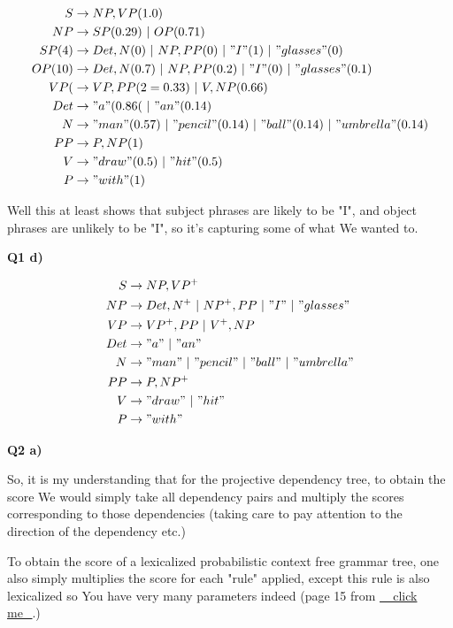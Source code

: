 \documentclass{article}
\newcommand*\OR{\ |\ }
\begin{document}
	\begin{align}
		S &\to NP, VP (1.0)\\
		NP &\to SP (0.29)\OR  OP (0.71)\\
		SP (4) &\to Det, N (0) \OR NP, PP (0)\OR "I" (1) \OR "glasses" (0)\\
		OP (10)&\to  Det, N (0.7) \OR NP, PP (0.2)\OR "I" (0)\OR "glasses" (0.1)\\
		VP (&\to VP, PP (2=0.33)\OR V, NP (0.66)\\		
		Det &\to "a" (0.86( \OR "an"(0.14)\\
		N &\to "man" (0.57)\OR "pencil"(0.14) \OR "ball"(0.14) \OR "umbrella"(0.14)\\
		PP &\to P, NP (1)\\
		V &\to "draw" (0.5) \OR "hit"(0.5)\\
		P &\to "with" (1) 
	\end{align}
	
	Well this at least shows that subject phrases are likely to be "I", and object phrases are unlikely to be "I", so it's capturing some of what We wanted to. 
	
\textbf{Q1 d)}
	
	\begin{align}
		S &\to NP, VP^+\\
		NP &\to Det, N^+ \OR NP^+, PP \OR "I" \OR "glasses"\\
		VP &\to VP^+, PP \OR V^+, NP\\		
		Det &\to "a" \OR "an"\\
		N &\to "man" \OR "pencil" \OR "ball" \OR "umbrella"\\
		PP &\to P, NP^+\\
		V &\to "draw" \OR "hit"\\
		P &\to "with" 
	\end{align}
	
\textbf{Q2 a)}

	So, it is my understanding that for the projective dependency tree, to obtain the score We would simply take all dependency pairs and multiply the scores corresponding to those dependencies (taking care to pay attention to the direction of the dependency etc.)
	
	To obtain the score of a lexicalized probabilistic context free grammar tree, one also simply multiplies the score for each "rule" applied, except this rule is also lexicalized so You have very many parameters indeed (page 15 from \href{http://www.cs.columbia.edu/~mcollins/courses/nlp2011/notes/lexpcfgs.pdf}{\_ click me\_}.)
	
\end{document}
